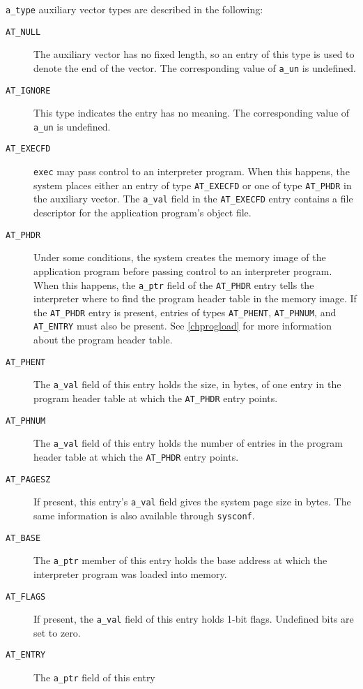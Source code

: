 \documentclass[english,11pt,twoside,toc=bib,toc=idx]{scrreprt}
\begin{document}
\texttt{a\_type} auxiliary vector types are described in the
following:
\begin{description}
\item[\texttt{AT\_NULL}] The auxiliary vector has no fixed length, so
  an entry of this type is used to denote the end of the vector.  The
  corresponding value of \texttt{a\_un} is undefined.
\item[\texttt{AT\_IGNORE}] This type indicates the entry has no
  meaning.  The corresponding value of \texttt{a\_un} is undefined.
\item[\texttt{AT\_EXECFD}] \texttt{exec} may pass control to an interpreter
  program.  When this happens, the system places either an entry of
  type \texttt{AT\_EXECFD} or one of type \texttt{AT\_PHDR} in the
  auxiliary vector.  The \texttt{a\_val} field in the
  \texttt{AT\_EXECFD} entry contains a file descriptor for the
  application program's object file.
\item[\texttt{AT\_PHDR}] Under some conditions, the system creates the
  memory image of the application program before passing control to an
  interpreter program.  When this happens, the \texttt{a\_ptr} field of
  the \texttt{AT\_PHDR} entry tells the interpreter where to find the
  program header table in the memory image.  If the \texttt{AT\_PHDR}
  entry is present, entries of types \texttt{AT\_PHENT},
  \texttt{AT\_PHNUM}, and \texttt{AT\_ENTRY} must also be present.  See
  \cref{chprogload} for more information about the program header
  table.
\item[\texttt{AT\_PHENT}] The \texttt{a\_val} field of this entry
  holds the size, in bytes, of one entry in the program header table
  at which the \texttt{AT\_PHDR} entry points.
\item[\texttt{AT\_PHNUM}] The \texttt{a\_val} field of this entry
  holds the number of entries in the program header table at which the
  \texttt{AT\_PHDR} entry points.
\item[\texttt{AT\_PAGESZ}] If present, this entry's \texttt{a\_val}
  field gives the system page size in bytes.  The same information is
  also available through \texttt{sysconf}.
\item[\texttt{AT\_BASE}] The \texttt{a\_ptr} member of this entry
  holds the base address at which the interpreter program was loaded
  into memory.
\item[\texttt{AT\_FLAGS}] If present, the \texttt{a\_val} field of
  this entry holds 1-bit flags.  Undefined bits are set to zero.
\item[\texttt{AT\_ENTRY}] The \texttt{a\_ptr} field of this entry

\end{description}
\end{document}
